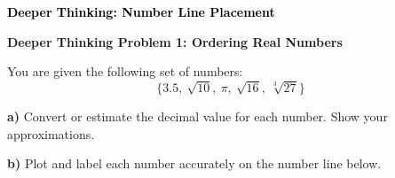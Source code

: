 \documentclass[12pt, letterpaper, fleqn]{article}
\begin{document}
\newpage

\begin{tcolorbox}[colback=customteal!20]
\large\textcolor{black}{\textbf{Deeper Thinking: Number Line Placement}}
\end{tcolorbox}

\vspace{3mm}

\begin{tcolorbox}[colback=white!15, colframe=black, boxrule=1.5pt, arc=4mm, left=6mm, right=6mm, top=5mm, bottom=5mm]

\textbf{Deeper Thinking Problem 1: Ordering Real Numbers}

\medskip

\noindent
You are given the following set of numbers:
\[ \{ 3.5, \ \sqrt{10}, \ \pi, \ \sqrt{16}, \ \sqrt[3]{27} \} \]

\vspace{5mm}

\noindent
\textbf{a)} Convert or estimate the decimal value for each number. Show your approximations.

\vspace{4cm}

\noindent
\textbf{b)} Plot and label each number accurately on the number line below.

\vspace{1cm}

\begin{center}
\end{center}

\vspace{1cm}

\end{tcolorbox}
\end{document}
